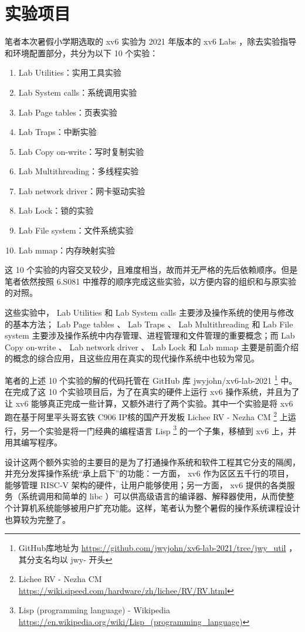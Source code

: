 \section{实验项目}

笔者本次暑假小学期选取的 xv6 实验为 2021 年版本的 xv6 Labs ，除去实验指导和环境配置部分，共分为以下 10 个实验：
\begin{enumerate}
    \item Lab Utilities：实用工具实验
    \item Lab System calls：系统调用实验
    \item Lab Page tables：页表实验
    \item Lab Traps：中断实验
    \item Lab Copy on-write：写时复制实验
    \item Lab Multithreading：多线程实验
    \item Lab network driver：网卡驱动实验
    \item Lab Lock：锁的实验
    \item Lab File system：文件系统实验
    \item Lab mmap：内存映射实验
\end{enumerate}

这 10 个实验的内容交叉较少，且难度相当，故而并无严格的先后依赖顺序。但是笔者依然按照 6.S081 中推荐的顺序完成这些实验，以方便内容的组织和与原实验的对照。

这些实验中， Lab Utilities 和 Lab System calls 主要涉及操作系统的使用与修改的基本方法； Lab Page tables 、 Lab Traps 、 Lab Multithreading 和 Lab File system 主要涉及操作系统中内存管理、进程管理和文件管理的重要概念；而 Lab Copy on-write 、 Lab network driver 、 Lab Lock 和 Lab mmap 主要是前面介绍的概念的综合应用，且这些应用在真实的现代操作系统中也较为常见。

笔者的上述 10 个实验的解的代码托管在  GitHub 库 jwyjohn/xv6-lab-2021 \footnote{ GitHub库地址为 \url{https://github.com/jwyjohn/xv6-lab-2021/tree/jwy_util} ， 其分支名均以 jwy- 开头} 中。在完成了这 10 个实验项目后，为了在真实的硬件上运行 xv6 操作系统，并且为了让 xv6 能够真正完成一些计算，又额外进行了两个实验。其中一个实验是将 xv6 跑在基于阿里平头哥玄铁 C906 IP核的国产开发板 Lichee RV - Nezha CM \footnote{Lichee RV - Nezha CM \url{https://wiki.sipeed.com/hardware/zh/lichee/RV/RV.html}} 上运行，另一个实验是将一门经典的编程语言 Lisp \footnote{Lisp (programming language) - Wikipedia \url{https://en.wikipedia.org/wiki/Lisp_(programming_language)}} 的一个子集，移植到 xv6 上，并用其编写程序。

设计这两个额外实验的主要目的是为了打通操作系统和软件工程其它分支的隔阂，并充分发挥操作系统“承上启下”的功能：一方面， xv6 作为区区五千行的项目，能够管理 RISC-V 架构的硬件，让用户能够使用；另一方面， xv6 提供的各类服务（系统调用和简单的 libc ）可以供高级语言的编译器、解释器使用，从而使整个计算机系统能够被用户扩充功能。这样，笔者认为整个暑假的操作系统课程设计也算较为完整了。

